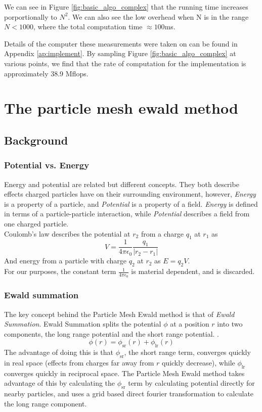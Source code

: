 \documentclass[pdftex,twoside,a4paper]{report}
\newcommand{\pmem}{Particle Mesh Ewald method}
\begin{document}
We can see in Figure \ref{fig:basic_algo_complex} that the running time increases porportionally to $N^2$. We can also see the low overhead when N is in the range $N < 1000$, where the total computation time $\approx 100$ms.

Details of the computer these measurements were taken on can be found in Appendix \ref{ap:implement}. By sampling Figure \ref{fig:basic_algo_complex} at various points, we find that the rate of computation for the implementation is approximately 38.9 Mflops.

\section{The particle mesh ewald method}
\subsection{Background}
\subsubsection{Potential vs. Energy}
Energy and potential are related but different concepts. They both describe effects charged particles have on their surrounding environment, however, \emph{Energy} is a property of a particle, and \emph{Potential} is a property of a field. \emph{Energy} is defined in terms of a particle-particle interaction, while \emph{Potential} describes a field from one charged particle.\\
Coulomb's law describes the potential at $r_2$ from a charge $q_1$ at $r_1$ as 
\[V=\frac{1}{4\pi \epsilon_0} \frac{q_1}{|r_2 - r_1|}\]
And energy from a particle with charge $q_2$ at $r_2$ as $E = q_2 V$.\\
For our purposes, the constant term $\frac{1}{4\pi \epsilon_0}$ is material dependent, and is discarded.
\subsubsection{Ewald summation}
The key concept behind the \pmem{} is that of \emph{Ewald Summation}. Ewald Summation splits the potential $\phi$ at a position $r$ into two components, the long range potential and the short range potential. \cite{petersen:3668}.
\[
\phi(r) = \phi_{\text{sr}}(r) + \phi_{\text{lr}}(r)
\]
The advantage of doing this is that $\phi_{\text{sr}}$, the short range term, converges quickly in real space (effects from charges far away from $r$ quickly decrease), while $\phi_{\text{lr}}$ converges quickly in reciprocal space. The \pmem{} takes advantage of this by calculating the $\phi_{\text{sr}}$ term by calculating potential directly for nearby particles, and uses a grid based direct fourier transformation to calculate the long range component.
\end{document}
